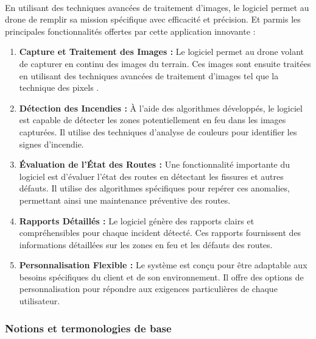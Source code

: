 \paragraph{}En utilisant des techniques avancées de traitement d'images, le logiciel permet au drone de remplir sa mission spécifique avec efficacité et précision. Et parmis les principales fonctionnalités offertes par cette application innovante : 
\begin{enumerate}
    \item \textbf{Capture et Traitement des Images :} Le logiciel permet au drone volant de capturer en continu des images du terrain. Ces images sont ensuite traitées en utilisant des techniques avancées de traitement d'images tel que la technique des pixels .

    \item \textbf{Détection des Incendies : }À l'aide des algorithmes développés, le logiciel est capable de détecter les zones potentiellement en feu dans les images capturées. Il utilise des techniques d'analyse de couleurs pour identifier les signes d'incendie.

     \item \textbf{Évaluation de l'État des Routes :} Une fonctionnalité importante du logiciel est d'évaluer l'état des routes en détectant les fissures et autres défauts. Il utilise des algorithmes spécifiques pour repérer ces anomalies, permettant ainsi une maintenance préventive des routes.

    \item \textbf{Rapports Détaillés :} Le logiciel génère des rapports clairs et compréhensibles pour chaque incident détecté. Ces rapports fournissent des informations détaillées sur les zones en feu  et les défauts des routes.

   \item \textbf{Personnalisation Flexible :} Le système est conçu pour être adaptable aux besoins spécifiques du client et de son environnement. Il offre des options de personnalisation pour répondre aux exigences particulières de chaque utilisateur.
   
\end{enumerate}
\subsubsection{Notions et termonologies de base}


